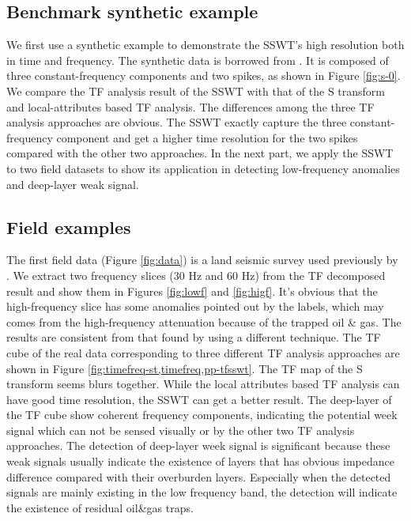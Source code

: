 \subsection{Benchmark synthetic example}
We first use a synthetic example to demonstrate the SSWT's high resolution both in time and frequency. The synthetic data is borrowed from \cite{guochang20112}. It is composed of three constant-frequency components and two spikes, as shown in Figure \ref{fig:s-0}. We compare the TF analysis result of the SSWT with that of the S transform and local-attributes based TF analysis.  %
The differences among the three TF analysis approaches are obvious. The SSWT exactly capture the three constant-frequency component and get a higher time resolution for the two spikes compared with the other two approaches. In the next part, we apply the SSWT to two field datasets to show its application in detecting low-frequency anomalies and deep-layer weak signal.

\subsection{Field examples}
The first field data (Figure \ref{fig:data}) is a land seismic survey used previously by \cite[]{fomel20132}. We extract two frequency slices (30 Hz and 60 Hz) from the TF decomposed result and show them in Figures \ref{fig:lowf} and \ref{fig:higf}. It's obvious that the high-frequency slice has some anomalies pointed out by the labels, which may comes from the high-frequency attenuation because of the trapped oil \& gas. The results are consistent from that found by \cite{fomel20132} using a different technique. The TF cube of the real data corresponding to three different TF analysis approaches are shown in Figure \ref{fig:timefreq-st,timefreq,pp-tfsswt}. The TF map of the S transform seems blurs together. While the local attributes based TF analysis can have good time resolution, the SSWT can get a better result.
The deep-layer of the TF cube show coherent frequency components, indicating the %
potential week signal which can not be sensed visually or by the other two TF analysis approaches. The detection of deep-layer week signal is significant because these weak signals usually indicate the existence of layers that has obvious impedance difference compared with their overburden layers. Especially when the detected signals are mainly existing in the low frequency band, the detection will indicate the existence of residual oil\&gas traps.

